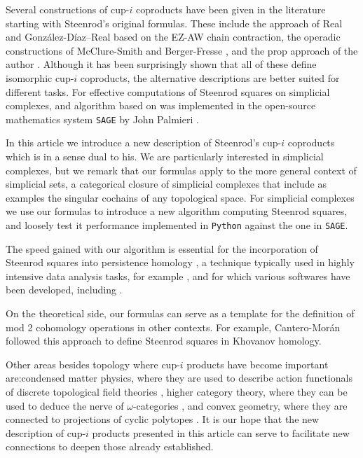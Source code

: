 Several constructions of cup-$i$ coproducts have been given in the literature starting with Steenrod's original formulas.
These include the approach of Real \cite{real1996computability} and Gonz\'alez-D\'iaz--Real \cite{gonzalez1999combinatorial, gonzalez2003computation, gonzalez2005hpt} based on the EZ-AW chain contraction, the operadic constructions of McClure-Smith \cite{mcclure03cochain} and Berger-Fresse \cite{berger04combinatorial}, and the prop approach of the author \cite{medina2020prop1, medina2018prop2}.
Although it has been surprisingly shown \cite{medina2018axiomatic} that all of these define isomorphic cup-$i$ coproducts, the alternative descriptions are better suited for different tasks.
For effective computations of Steenrod squares on simplicial complexes, and algorithm based on \cite{gonzalez1999combinatorial} was implemented in the open-source mathematics system \verb|SAGE| by John Palmieri \cite{sagemath}.

In this article we introduce a new description of Steenrod's cup-$i$ coproducts which is in a sense dual to his.
We are particularly interested in simplicial complexes, but we remark that our formulas apply to the more general context of simplicial sets, a categorical closure of simplicial complexes that include as examples the singular cochains of any topological space.
For simplicial complexes we use our formulas to introduce a new algorithm computing Steenrod squares, and loosely test it performance implemented in \verb|Python| against the one in \verb|SAGE|.

The speed gained with our algorithm is essential for the incorporation of Steenrod squares into persistence homology \cite{medina2018persistence}, a technique typically used in highly intensive data analysis tasks, for example \cite{chan2013topology, lee2018nanoporous}, and for which various softwares have been developed, including \cite{bauer2019ripser, gudhi, medina2020giottotda}.

On the theoretical side, our formulas can serve as a template for the definition of mod 2 cohomology operations in other contexts.
For example, Cantero-Mor\'an \cite{cantero2020khovanov} followed this approach to define Steenrod squares in Khovanov homology.

Other areas besides topology where cup-$i$ products have become important are:condensed matter physics, where they are used to describe action functionals of discrete topological field theories \cite{gaiotto2016spin, bhardwaj2017state, kapustin2017fermionic}, higher category theory, where they can be used to deduce the nerve of $\omega$-categories \cite{medina2020globular}, and convex geometry, where they are connected to projections of cyclic polytopes \cite{kapranov1991combinatorial}.
It is our hope that the new description of cup-$i$ products presented in this article can serve to facilitate new connections to deepen those already established.

